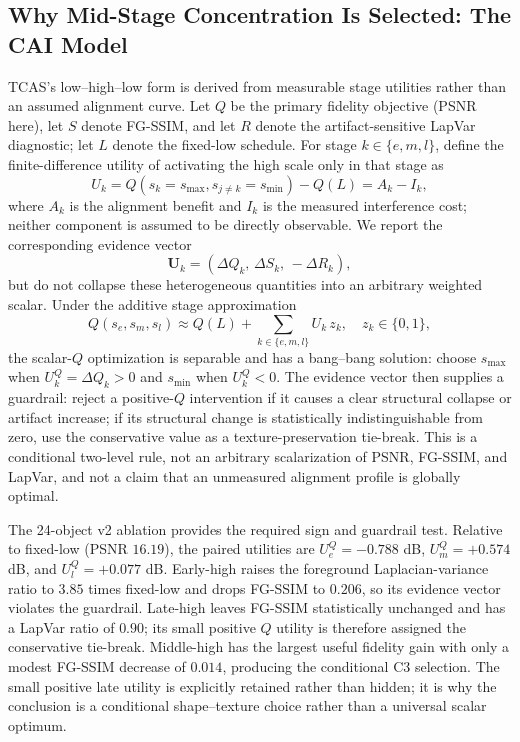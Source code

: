 \documentclass[times,twocolumn,final]{elsarticle}
\begin{document}
\subsection{Why Mid-Stage Concentration Is Selected: The CAI Model}
\label{subsec:cai}
TCAS's low--high--low form is derived from measurable stage utilities rather than an assumed alignment curve. Let $Q$ be the primary fidelity objective (PSNR here), let $S$ denote FG-SSIM, and let $R$ denote the artifact-sensitive LapVar diagnostic; let $L$ denote the fixed-low schedule. For stage $k\in\{e,m,l\}$, define the finite-difference utility of activating the high scale only in that stage as
\begin{equation}
U_k = Q(s_k=s_{\max},s_{j\ne k}=s_{\min})-Q(L)=A_k-I_k,
\label{eq:cai-utility}
\end{equation}
where $A_k$ is the alignment benefit and $I_k$ is the measured interference cost; neither component is assumed to be directly observable. We report the corresponding evidence vector
\begin{equation}
\mathbf U_k = (\Delta Q_k,\,\Delta S_k,\,-\Delta R_k),
\label{eq:cai-vector}
\end{equation}
but do not collapse these heterogeneous quantities into an arbitrary weighted scalar. Under the additive stage approximation
\begin{equation}
Q(s_e,s_m,s_l)\approx Q(L)+\sum_{k\in\{e,m,l\}}U_k\,z_k,
\quad z_k\in\{0,1\},
\label{eq:cai-additive}
\end{equation}
the scalar-$Q$ optimization is separable and has a bang--bang solution: choose $s_{\max}$ when $U_k^Q=\Delta Q_k>0$ and $s_{\min}$ when $U_k^Q<0$. The evidence vector then supplies a guardrail: reject a positive-$Q$ intervention if it causes a clear structural collapse or artifact increase; if its structural change is statistically indistinguishable from zero, use the conservative value as a texture-preservation tie-break. This is a conditional two-level rule, not an arbitrary scalarization of PSNR, FG-SSIM, and LapVar, and not a claim that an unmeasured alignment profile is globally optimal.

The 24-object v2 ablation provides the required sign and guardrail test. Relative to fixed-low (PSNR $16.19$), the paired utilities are $U_e^Q=-0.788$ dB, $U_m^Q=+0.574$ dB, and $U_l^Q=+0.077$ dB. Early-high raises the foreground Laplacian-variance ratio to $3.85$ times fixed-low and drops FG-SSIM to $0.206$, so its evidence vector violates the guardrail. Late-high leaves FG-SSIM statistically unchanged and has a LapVar ratio of $0.90$; its small positive $Q$ utility is therefore assigned the conservative tie-break. Middle-high has the largest useful fidelity gain with only a modest FG-SSIM decrease of $0.014$, producing the conditional C3 selection. The small positive late utility is explicitly retained rather than hidden; it is why the conclusion is a conditional shape--texture choice rather than a universal scalar optimum.
\end{document}
